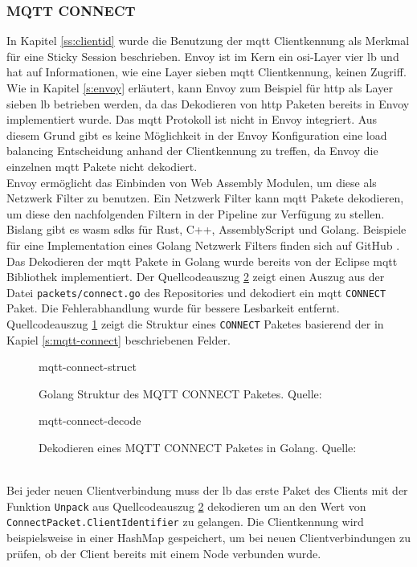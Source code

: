 \subsubsection{MQTT CONNECT}
In Kapitel \ref{ss:clientid} wurde die Benutzung der \ac{mqtt} Clientkennung als Merkmal für eine Sticky Session beschrieben. Envoy ist im Kern ein \ac{osi}-Layer vier \acl{lb} und hat auf Informationen, wie eine Layer sieben \ac{mqtt} Clientkennung, keinen Zugriff. Wie in Kapitel \ref{s:envoy} erläutert, kann Envoy zum Beispiel für \ac{http} als Layer sieben \ac{lb} betrieben werden, da das Dekodieren von \ac{http} Paketen bereits in Envoy implementiert wurde.
Das \ac{mqtt} Protokoll ist nicht in Envoy integriert. Aus diesem Grund gibt es keine Möglichkeit in der Envoy Konfiguration eine load balancing Entscheidung anhand der Clientkennung zu treffen, da Envoy die einzelnen \ac{mqtt} Pakete nicht dekodiert.
\\
Envoy ermöglicht das Einbinden von Web Assembly Modulen, um diese als Netzwerk Filter zu benutzen. Ein Netzwerk Filter kann \ac{mqtt} Pakete dekodieren, um diese den nachfolgenden Filtern in der Pipeline zur Verfügung zu stellen. Bislang gibt es \ac{wasm} \acp{sdk} für Rust, C++, AssemblyScript und Golang. \cite{sebastianHowWriteWASM} Beispiele für eine Implementation eines Golang Netzwerk Filters finden sich auf GitHub \cite{TetratelabsProxywasmgosdk2021}.
\\
Das Dekodieren der \ac{mqtt} Pakete in Golang wurde bereits von der Eclipse \ac{mqtt} Bibliothek \cite{EclipsePahoMqtt2021} implementiert.
Der Quellcodeauszug \ref{code:mqtt-connect-decode} zeigt einen Auszug aus der Datei \verb|packets/connect.go| des Repositories und dekodiert ein \ac{mqtt} \verb|CONNECT| Paket. Die Fehlerabhandlung wurde für bessere Lesbarkeit entfernt. Quellcodeauszug \ref{code:mqtt-connect-struct} zeigt die Struktur eines \verb|CONNECT| Paketes basierend der in Kapiel \ref{s:mqtt-connect} beschriebenen Felder.
\begin{figure}
    {mqtt-connect-struct}
    \caption{Golang Struktur des MQTT CONNECT Paketes. Quelle: \cite{EclipsePahoMqtt2021}}
    \label{code:mqtt-connect-struct}
\end{figure}
\begin{figure}
    {mqtt-connect-decode}
    \caption{Dekodieren eines MQTT CONNECT Paketes in Golang. Quelle: \cite{EclipsePahoMqtt2021}}
    \label{code:mqtt-connect-decode}
\end{figure}
\\
Bei jeder neuen Clientverbindung muss der \acl{lb} das erste Paket des Clients mit der Funktion \verb|Unpack| aus Quellcodeauszug \ref{code:mqtt-connect-decode} dekodieren um an den Wert von\newline
\verb|ConnectPacket.ClientIdentifier| zu gelangen.
Die Clientkennung wird beispielsweise in einer HashMap gespeichert, um bei neuen Clientverbindungen zu prüfen, ob der Client bereits mit einem Node verbunden wurde.

